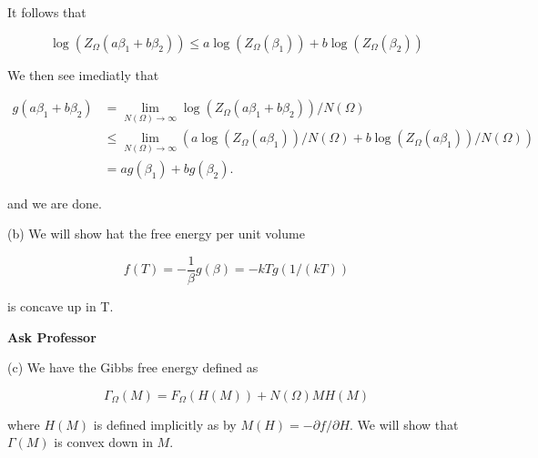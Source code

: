 \documentclass[12pt]{article}
\numberwithin{equation}{section}
\begin{document}
It follows that 

\begin{equation}
    \log(Z_\Omega(a\beta_1 + b\beta_2)) \leq a\log(Z_\Omega(\beta_1)) + b\log(Z_\Omega(\beta_2))
\end{equation}

We then see imediatly that 

\[
\begin{aligned}
    g(a\beta_1 + b\beta_2) &= \lim_{N(\Omega) \to \infty}\log(Z_\Omega(a\beta_1 + b\beta_2))/N(\Omega)  \\
    & \leq \lim_{N(\Omega) \to \infty}(a\log(Z_\Omega(a\beta_1))/N(\Omega) + b\log(Z_\Omega(a\beta_1))/N(\Omega)) \\
    &= ag(\beta_1) + bg(\beta_2).
\end{aligned}
\]

and we are done.

(b) We will show hat
the free energy per unit volume

\begin{equation}
    f(T) = -\frac{1}{\beta}g(\beta) = -k T g(1/(kT))
\end{equation}

is concave up in T.

\textbf{Ask Professor}

(c) We have the Gibbs free energy defined as 

\begin{equation}
    \Gamma_\Omega(M) = F_\Omega(H(M)) + N(\Omega)MH(M)
\end{equation}

where $H(M)$ is defined implicitly as by $M(H) = -\partial f / \partial H$. We will show that $\Gamma(M)$ is 
convex down in $M$.
\end{document}
